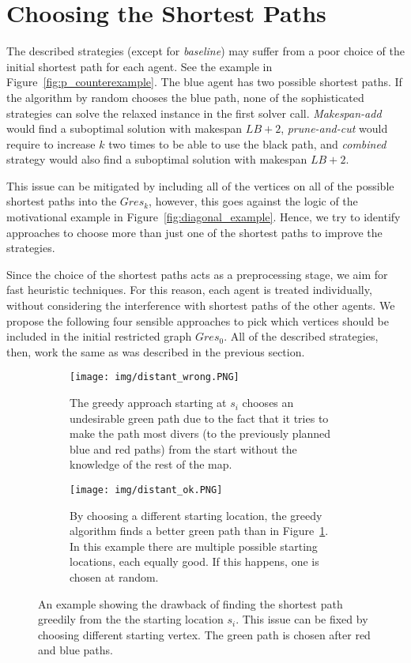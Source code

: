 \section{Choosing the Shortest Paths}
\label{sec:SP}

The described strategies (except for \emph{baseline}) may suffer from a poor choice of the initial shortest path for each agent. See the example in Figure~\ref{fig:p_counterexample}. The blue agent has two possible shortest paths. If the algorithm by random chooses the blue path, none of the sophisticated strategies can solve the relaxed instance in the first solver call. \emph{Makespan-add} would find a suboptimal solution with makespan $LB+2$, \emph{prune-and-cut} would require to increase $k$ two times to be able to use the black path, and \emph{combined} strategy would also find a suboptimal solution with makespan $LB+2$.

This issue can be mitigated by including all of the vertices on all of the possible shortest paths into the $\mathit{Gres}_{k}$, however, this goes against the logic of the motivational example in Figure~\ref{fig:diagonal_example}. Hence, we try to identify approaches to choose more than just one of the shortest paths to improve the strategies.

Since the choice of the shortest paths acts as a preprocessing stage, we aim for fast heuristic techniques. For this reason, each agent is treated individually, without considering the interference with shortest paths of the other agents. We propose the following four sensible approaches to pick which vertices should be included in the initial restricted graph $\mathit{Gres}_{0}$. All of the described strategies, then, work the same as was described in the previous section.
%
\begin{figure*}[ht]
\centering

\begin{subfigure}[t]{0.99\columnwidth}
\centering
\texttt{[image: img/distant\_wrong.PNG]}
\caption{The greedy approach starting at $s_i$ chooses an undesirable green path due to the fact that it tries to make the path most divers (to the previously planned blue and red paths) from the start without the knowledge of the rest of the map.} %
\label{fig:distant_wrong}
\end{subfigure}
\hfill
\begin{subfigure}[t]{0.99\columnwidth}
\centering
\texttt{[image: img/distant\_ok.PNG]}
\caption{By choosing a different starting location, the greedy algorithm finds a better green path than in Figure~\ref{fig:distant_wrong}. In this example there are multiple possible starting locations, each equally good. If this happens, one is chosen at random.}
\label{fig:distant_ok}
\end{subfigure}
\caption{An example showing the drawback of finding the shortest path greedily from the the starting location $s_i$. This issue can be fixed by choosing different starting vertex. The green path is chosen after red and blue paths.}
\label{fig:distant}
\end{figure*}

